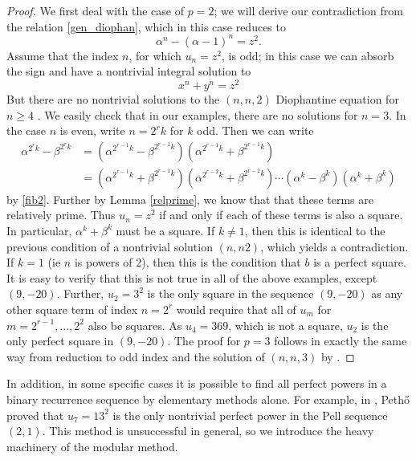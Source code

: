 \documentclass[12pt]{amsart}
\theoremstyle{definition}
\begin{document}
\begin{proof}

We first deal with the case of $p=2$; we will derive our contradiction from the relation \eqref{gen_diophan}, which in this case reduces to
\begin{equation}\label{D1dio} \alpha^n - (\alpha-1)^n = z^2.\end{equation} 
Assume that the index $n$, for which $u_n = z^2$, is odd; in this case we can absorb the sign and have a nontrivial integral solution to
\[ x^n +y^n = z^2 \]
But there are no nontrivial solutions to the $(n,n,2)$ Diophantine equation for $n \geq 4$  \cite{darmon97} .  We easily check that in our examples, there are no solutions for $n=3$.  In the case $n$ is even, write $n=2^rk$ for $k$ odd.  Then we can write
\begin{align*}
\alpha^{2^rk} - \beta^{2^rk} & = (\alpha^{2^{r-1}k} - \beta^{2^{r-1}k})(\alpha^{2^{r-1}k} + \beta^{2^{r-1}k}) \\
& = (\alpha^{2^{r-1}k} + \beta^{2^{r-1}k})(\alpha^{2^{r-2}k} + \beta^{2^{r-2}k}) \cdots (\alpha^{k} - \beta^{k}) (\alpha^{k} + \beta^{k})
\end{align*}
by \eqref{fib2}.  Further by Lemma \ref{relprime}, we know that that these terms are relatively prime.  Thus $u_n=z^2$ if and only if each of these terms is also a square.  In particular, $\alpha^k + \beta^k$ must be a square.  If $k \neq 1$, then this is identical to the previous condition of a nontrivial solution $(n,n2)$, which yields a contradiction.  If $k = 1$ (ie $n$ is powers of $2$), then this is the condition that $b$ is a perfect square.  It is easy to verify that this is not true in all of the above examples, except $(9,-20)$.  Further, $u_2 = 3^2$ is the only square in the sequence $(9,-20)$ as any other square term of index $n = 2^r$ would require that all of $u_m$ for $m = 2^{r-1},...,2^2$ also be squares.  As $u_4 = 369$, which is not a square, $u_2$ is the only perfect square in $(9,-20)$.  The proof for $p=3$ follows in exactly the same way from reduction to odd index and the solution of $(n,n,3)$ by \cite{darmon97}.

\end{proof}

In addition, in some specific cases it is possible to find all perfect powers in a binary recurrence sequence by elementary methods alone.  For example, in \cite{petho92}, Peth{\H{o}} proved that $u_7 = 13^2$ is the only nontrivial perfect power in the Pell sequence $(2,1)$.  This method is unsuccessful in general, so we introduce the heavy machinery of the modular method.
\end{document}

